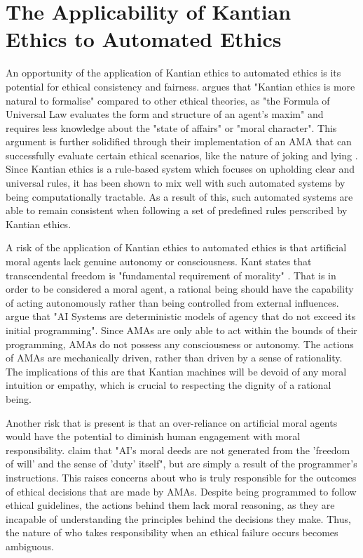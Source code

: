 \documentclass{article}
\begin{document}
\section{The Applicability of Kantian Ethics to Automated Ethics}

An opportunity of the application of Kantian ethics to automated ethics is its potential for ethical consistency and 
fairness. \textcite[p. 16]{singh2022} argues that "Kantian ethics is more natural to formalise" compared
to other ethical theories, as "the Formula of Universal Law evaluates the form and structure of an agent's
maxim" and requires less knowledge about the "state of affairs" or "moral character". This argument is 
further solidified through their implementation of an AMA that can successfully evaluate certain
ethical scenarios, like the nature of joking and lying \parencite[6--7]{singh2022}. Since Kantian
ethics is a rule-based system which focuses on upholding clear and universal rules, it has been shown to
mix well with such automated systems by being computationally tractable. As a result of this, such 
automated systems are able to remain consistent when following a set of predefined rules perscribed by
Kantian ethics.

A risk of the application of Kantian ethics to automated ethics is that artificial moral agents lack
genuine autonomy or consciousness. Kant states that transcendental freedom is "fundamental requirement of morality"
\parencite[p. 142]{mannananth2021}. That is in order to be considered a moral agent, a rational being should 
have the capability of acting autonomously rather than being controlled from external influences. \textcite[p. 149]{mannananth2021}
argue that "AI Systems are deterministic models of agency that do not exceed its initial programming". Since AMAs are
only able to act within the bounds of their programming, AMAs do not possess any consciousness or autonomy. The actions
of AMAs are mechanically driven, rather than driven by a sense of rationality. The implications of this are that 
Kantian machines will be devoid of any moral intuition or empathy, which is crucial to respecting the dignity of
a rational being.

Another risk that is present is that an over-reliance on artificial moral agents would have the potential to diminish human engagement
with moral responsibility. \textcite[p. 146]{mannananth2021} claim that "AI's moral deeds are not generated from
the 'freedom of will' and the sense of 'duty' itself", but are simply a result of the programmer's instructions. 
This raises concerns about who is truly responsible for the outcomes of ethical decisions that are made by AMAs. 
Despite being programmed to follow ethical guidelines, the actions behind them lack moral reasoning, as they are 
incapable of understanding the principles behind the decisions they make. Thus, the nature of who takes responsibility
when an ethical failure occurs becomes ambiguous.
\end{document}
